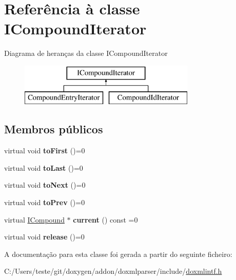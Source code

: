 \hypertarget{class_i_compound_iterator}{\section{Referência à classe I\-Compound\-Iterator}
\label{class_i_compound_iterator}
}
Diagrama de heranças da classe I\-Compound\-Iterator\begin{figure}[H]
\begin{center}
\leavevmode
\includegraphics[height=2.000000cm]{class_i_compound_iterator}
\end{center}
\end{figure}
\subsection*{Membros públicos}
\begin{DoxyCompactItemize}
\item 
\hypertarget{class_i_compound_iterator_a86b87aa42e3e820d2c21ae552bd0a55d}{virtual void {\bfseries to\-First} ()=0}\label{class_i_compound_iterator_a86b87aa42e3e820d2c21ae552bd0a55d}

\item 
\hypertarget{class_i_compound_iterator_a9c80b2b75a3575aeea8a5b211119c6d3}{virtual void {\bfseries to\-Last} ()=0}\label{class_i_compound_iterator_a9c80b2b75a3575aeea8a5b211119c6d3}

\item 
\hypertarget{class_i_compound_iterator_a03ab44b53fe4f1b143b50a3ff118c831}{virtual void {\bfseries to\-Next} ()=0}\label{class_i_compound_iterator_a03ab44b53fe4f1b143b50a3ff118c831}

\item 
\hypertarget{class_i_compound_iterator_a35c099174eca466a4277050c864efc8e}{virtual void {\bfseries to\-Prev} ()=0}\label{class_i_compound_iterator_a35c099174eca466a4277050c864efc8e}

\item 
\hypertarget{class_i_compound_iterator_a9d4d6403b46da6392d5b5ac030da532f}{virtual \hyperlink{class_i_compound}{I\-Compound} $\ast$ {\bfseries current} () const =0}\label{class_i_compound_iterator_a9d4d6403b46da6392d5b5ac030da532f}

\item 
\hypertarget{class_i_compound_iterator_aab0a52fdd148a54108e7bf49287d7c47}{virtual void {\bfseries release} ()=0}\label{class_i_compound_iterator_aab0a52fdd148a54108e7bf49287d7c47}

\end{DoxyCompactItemize}


A documentação para esta classe foi gerada a partir do seguinte ficheiro\-:\begin{DoxyCompactItemize}
\item 
C\-:/\-Users/teste/git/doxygen/addon/doxmlparser/include/\hyperlink{include_2doxmlintf_8h}{doxmlintf.\-h}\end{DoxyCompactItemize}
